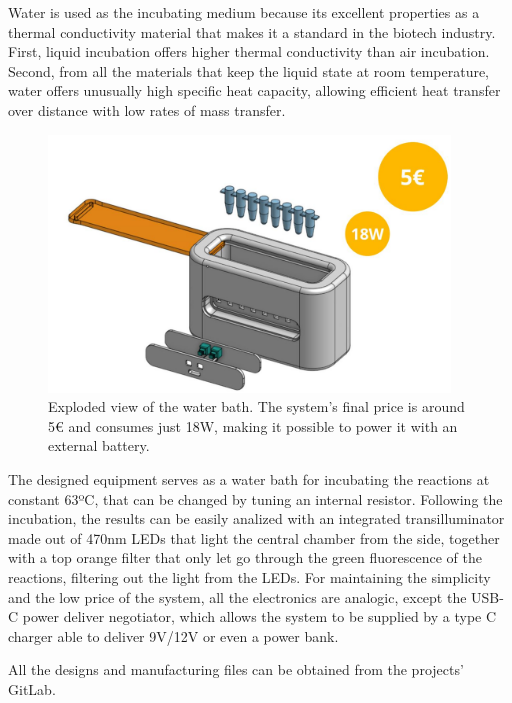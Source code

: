 Water is used as the incubating medium because its excellent properties as a thermal conductivity material that makes it a standard in the biotech industry. First, liquid incubation offers higher thermal conductivity than air incubation. Second, from all the materials that keep the liquid state at room temperature, water offers unusually high specific heat capacity, allowing efficient heat transfer over distance with low rates of mass transfer\cite{company_nalco_1979}.

 \begin{figure}[b]
    \centering
    \includegraphics[width=0.95\textwidth]{figures/WaterBath.JPG}
    \caption{Exploded view of the water bath. The system's final price is around 5€ and consumes just 18W, making it possible to power it with an external battery.}
    \label{Exploded view water bath}
\end{figure}

The designed equipment serves as a water bath for incubating the reactions at constant 63ºC, that can be changed by tuning an internal resistor. Following the incubation, the results can be easily analized with an integrated transilluminator made out of 470nm LEDs that light the central chamber from the side, together with a top orange filter that only let go through the green fluorescence of the reactions, filtering out the light from the LEDs. For maintaining the simplicity and the low price of the system, all the electronics are analogic, except the USB-C power deliver negotiator, which allows the system to be supplied by a type C charger able to deliver 9V/12V or even a power bank.

All the designs and manufacturing files can be obtained from the projects' GitLab\cite{francisco_javier_quero_lombardero_open_2021}.


